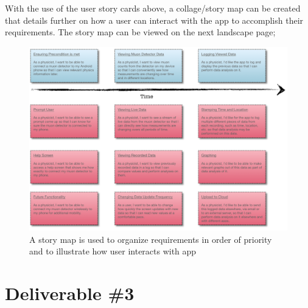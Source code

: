 \documentclass[11pt,a4paper]{article}
\begin{document}
With the use of the user story cards above, a collage/story map can be created that details further on how a user can interact with the app to accomplish their requirements. The story map can be viewed on the next landscape page;

\newpage
\begin{landscape}
\begin{figure}[h]
  \centering
  \vspace*{-2cm} \hspace*{-0.5cm}
      \includegraphics[width=1.9\textwidth]{storymap.png}
      \caption{A story map is used to organize requirements in order of priority and to illustrate how user interacts with app}
  
\end{figure}
\end{landscape}

\section*{Deliverable \#3}
\end{document}
